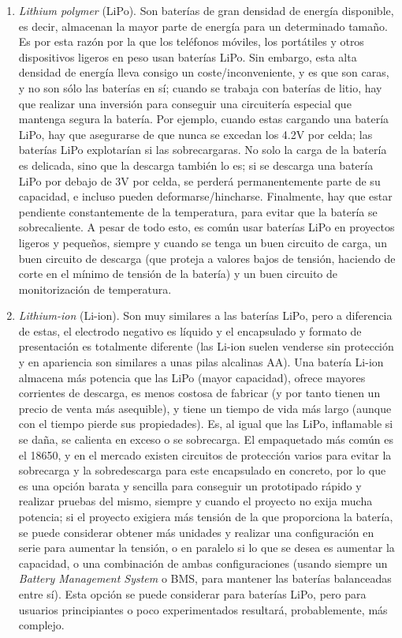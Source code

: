 \documentclass[12pt]{article}
\begin{document}
	\begin{enumerate}
		
		\item \textit{Lithium polymer} (LiPo).  Son baterías de gran densidad de energía disponible, es decir, almacenan la mayor parte de energía para un determinado tamaño. Es por esta razón por la que los teléfonos móviles, los portátiles y otros dispositivos ligeros en peso usan baterías LiPo. Sin embargo, esta alta densidad de energía lleva consigo un coste/inconveniente, y es que son caras, y no son sólo las baterías en sí; cuando se trabaja con baterías de litio, hay que realizar una inversión para conseguir una circuitería especial que mantenga segura la batería. Por ejemplo, cuando estas cargando una batería LiPo, hay que asegurarse de que nunca se excedan los 4.2V por celda; las baterías LiPo explotarían si las sobrecargaras. No solo la carga de la batería es delicada, sino que la descarga también lo es; si se descarga una batería LiPo por debajo de 3V por celda, se perderá permanentemente parte de su capacidad, e incluso pueden deformarse/hincharse. Finalmente, hay que estar pendiente constantemente de la temperatura, para evitar que la batería se sobrecaliente. A pesar de todo esto, es común usar baterías LiPo en proyectos ligeros y pequeños, siempre y cuando se tenga un buen circuito de carga, un buen circuito de descarga (que proteja a valores bajos de tensión, haciendo de corte en el mínimo de tensión de la batería) y un buen circuito de monitorización de temperatura. 
		
		\item \textit{Lithium-ion} (Li-ion). Son muy similares a las baterías LiPo, pero a diferencia de estas, el electrodo negativo es líquido y el encapsulado y formato de presentación es totalmente diferente (las Li-ion suelen venderse sin protección y en apariencia son similares a unas pilas alcalinas AA). Una batería Li-ion almacena más potencia que las LiPo (mayor capacidad), ofrece mayores corrientes de descarga, es menos costosa de fabricar (y por tanto tienen un precio de venta más asequible),  y tiene un tiempo de vida más largo (aunque con el tiempo pierde sus propiedades). Es, al igual que las LiPo, inflamable si se daña, se calienta en exceso o se sobrecarga. El empaquetado más común es el 18650, y en el mercado existen circuitos de protección varios para evitar la sobrecarga y la sobredescarga  para este encapsulado en concreto, por lo que es una opción barata y sencilla para conseguir un prototipado rápido y realizar pruebas del mismo, siempre y cuando el proyecto no exija mucha potencia; si el proyecto exigiera más tensión de la que proporciona la batería, se puede considerar obtener más unidades y realizar una configuración en serie para aumentar la tensión, o en paralelo si lo que se desea es aumentar la capacidad, o una combinación de ambas configuraciones (usando siempre un \textit{Battery Management System} o BMS, para mantener las baterías balanceadas entre sí). Esta opción se puede considerar para baterías LiPo, pero para usuarios principiantes o poco experimentados resultará, probablemente, más complejo.
		

\end{enumerate}
\end{document}
